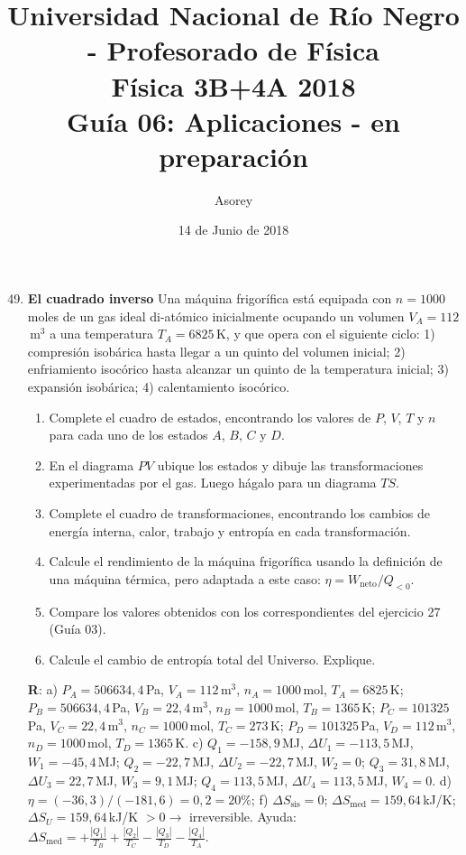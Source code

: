 \documentclass[a4paper,12pt]{article}
\begin{document}
\title{
{\normalsize{Universidad Nacional de Río Negro - Profesorado de Física}}\\
Física 3B+4A  2018 \\ Guía 06: Aplicaciones - en preparación
}
\author{Asorey}
\date{14 de Junio de 2018} 
\maketitle

\begin{enumerate}
	\setcounter{enumi}{48}      %
    
	\item {\bf{El cuadrado inverso}}
		Una máquina frigorífica está equipada con $n=1000$\,moles de un gas
		ideal di-atómico inicialmente ocupando un volumen $V_A=112$\,m$^3$ a una
		temperatura $T_A=6825$\,K, y que opera con el siguiente ciclo: 1)
		compresión isobárica hasta llegar a un quinto del volumen inicial; 2) enfriamiento isocórico hasta alcanzar un quinto de la temperatura inicial; 3) expansión isobárica; 4) calentamiento isocórico.
        \begin{enumerate}
            \item Complete el cuadro de estados, encontrando los valores de
                $P$, $V$, $T$ y $n$ para cada uno de los estados $A$, $B$, $C$
                y $D$.
            \item En el diagrama $PV$ ubique los estados y dibuje las
				transformaciones experimentadas por el gas. Luego hágalo para
				un diagrama $TS$.
            \item Complete el cuadro de transformaciones, encontrando los
                cambios de energía interna, calor, trabajo y entropía en cada
                transformación.
			\item Calcule el rendimiento de la máquina frigorífica usando la
				definición de una máquina térmica, pero adaptada a este caso:
				$\eta=W_{\mathrm{neto}}/Q_{<0}$.
			\item Compare los valores obtenidos con los correspondientes del
				ejercicio 27 (Guía 03).
			\item Calcule el cambio de entropía total del Universo. Explique.
        \end{enumerate}
        {\bf{R}}: a) 
		$P_A=506634,4$\,Pa, $V_A=112$\,m$^3$, $n_A=1000$\,mol, $T_A=6825$\,K; 
		$P_B=506634,4$\,Pa, $V_B=22,4$\,m$^3$, $n_B=1000$\,mol, $T_B=1365$\,K; 
		$P_C=101325$\,Pa, $V_C=22,4$\,m$^3$, $n_C=1000$\,mol, $T_C=273$\,K; 
		$P_D=101325$\,Pa, $V_D=112$\,m$^3$, $n_D=1000$\,mol, $T_D=1365$\,K. 
		c) 
		$Q_1=-158,9$\,MJ, $\Delta U_1=-113,5$\,MJ, $W_1=-45,4$\,MJ;
		$Q_2=-22,7$\,MJ, $\Delta U_2=-22,7$\,MJ, $W_2=0$;
		$Q_3=31,8$\,MJ, $\Delta U_3=22,7$\,MJ, $W_3=9,1$\,MJ; 
        $Q_4=113,5$\,MJ, $\Delta U_4=113,5$\,MJ, $W_4=0$. 
		d) $\eta=(-36,3)/(-181,6) = 0,2 = 20\%$; 
		f) $\Delta S_{\mathrm{sis}} = 0$; $\Delta
		S_{\mathrm{med}}=159,64$\,kJ/K; $\Delta S_U=159,64$\,kJ/K $>0 \to$
		irreversible. Ayuda: $\Delta S_{\mathrm{med}} = +\frac{|Q_1|}{T_B} +
		\frac{|Q_2|}{T_C} - \frac{|Q_3|}{T_D} - \frac{|Q_4|}{T_A}$.
	

\end{enumerate}
\end{document}
